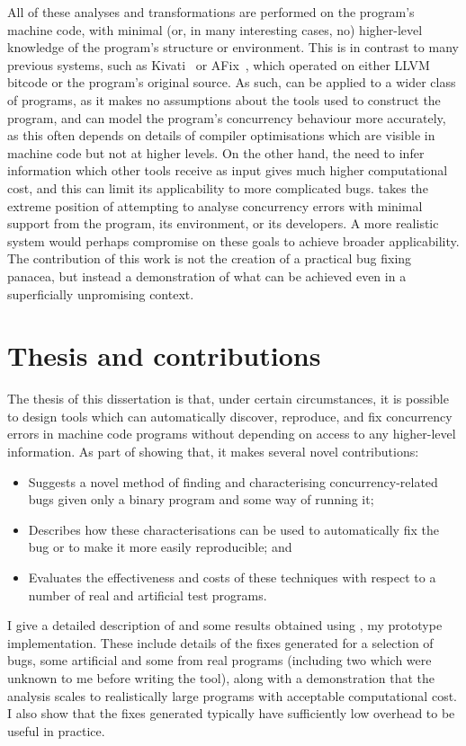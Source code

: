 All of these analyses and transformations are performed on the
program's machine code, with minimal (or, in many interesting cases,
no) higher-level knowledge of the program's structure or environment.
This is in contrast to many previous systems, such as
Kivati~\cite{Chew2010} or AFix~\cite{Jin2011}, which operated on
either LLVM bitcode or the program's original source.  As such,
{\technique} can be applied to a wider class of programs, as it makes
no assumptions about the tools used to construct the program, and can
model the program's concurrency behaviour more accurately, as this
often depends on details of compiler optimisations which are visible
in machine code but not at higher levels.  On the other hand, the need
to infer information which other tools receive as input gives
{\technique} much higher computational cost, and this can limit its
applicability to more complicated bugs.  {\Technique} takes the
extreme position of attempting to analyse concurrency errors with
minimal support from the program, its environment, or its developers.
A more realistic system would perhaps compromise on these goals to
achieve broader applicability.  The contribution of this work is not
the creation of a practical bug fixing panacea, but instead a
demonstration of what can be achieved even in a superficially
unpromising context.

\section{Thesis and contributions}

The thesis of this dissertation is that, under certain circumstances,
it is possible to design tools which can automatically discover,
reproduce, and fix concurrency errors in machine code programs without
depending on access to any higher-level information.  As part of
showing that, it makes several novel contributions:
\begin{itemize}
\item
  Suggests a novel method of finding and characterising
  concurrency-related bugs given only a binary program and some way of
  running it;
\item
  Describes how these characterisations can be used to automatically
  fix the bug or to make it more easily reproducible; and
\item
  Evaluates the effectiveness and costs of these techniques with
  respect to a number of real and artificial test programs.
\end{itemize}
I give a detailed description of {\technique} and some results
obtained using \implementation, my prototype implementation.  These
include details of the fixes generated for a selection of bugs, some
artificial and some from real programs (including two which were
unknown to me before writing the tool), along with a demonstration
that the analysis scales to realistically large programs with
acceptable computational cost.  I also show that the fixes generated
typically have sufficiently low overhead to be useful in practice.

